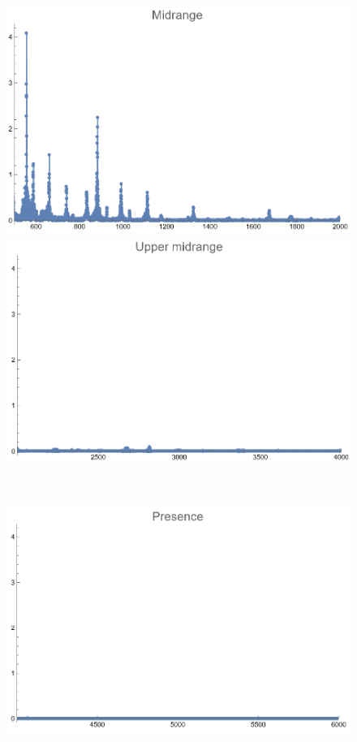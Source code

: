 \documentclass[12pt, letterpaper]{article}
\begin{document}
\begin{figure}[H]
\begin{minipage}{.3\textwidth}
  \end{minipage}
  \begin{minipage}{0.03\textwidth}\end{minipage}
  \begin{minipage}{.3\textwidth}
    \centering
    \includegraphics[width=.9\linewidth]{imgs/Cancion1/mid.png}
  \end{minipage}
  \begin{minipage}{0.03\textwidth}\end{minipage}
  \begin{minipage}{.3\textwidth}
    \centering
    \includegraphics[width=.9\linewidth]{imgs/Cancion1/upmid.png}
  \end{minipage} \medskip \\
  \begin{minipage}{.3\textwidth}
    \centering
    \includegraphics[width=.9\linewidth]{imgs/Cancion1/presence.png}

\end{minipage}
\end{figure}
\end{document}
